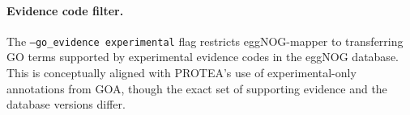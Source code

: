 \paragraph{Evidence code filter.}
The \texttt{--go\_evidence experimental} flag restricts eggNOG-mapper to
transferring GO terms supported by experimental evidence codes in the eggNOG
database. This is conceptually aligned with PROTEA's use of experimental-only
annotations from GOA, though the exact set of supporting evidence and the
database versions differ.
